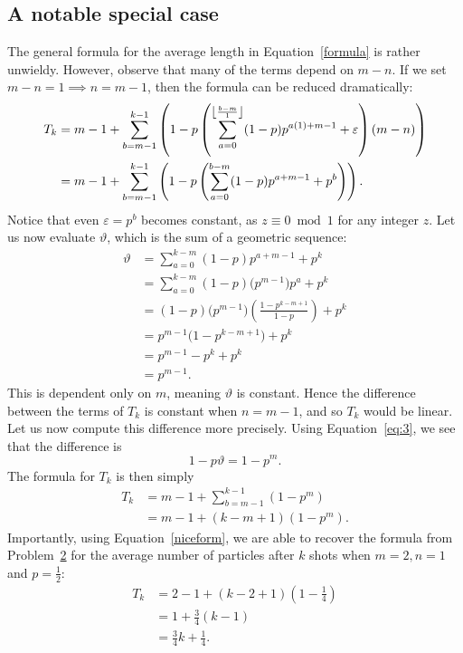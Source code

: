 \subsection{A notable special case}
The general formula for the average length in Equation~\ref{formula} is rather unwieldy. However, observe that many of the terms depend on $m-n$. If we set  $m-n = 1 \implies n = m - 1$, then the formula can be reduced dramatically:
\begin{align}
  T_k &= m-1+\sum _{b=m-1}^{k-1} \left(1-p \left(\sum _{a=0}^{\floor*{\frac{b-m}{1}} } (1-p) p^{a (1)+m-1}+\varepsilon\right) (m-n)\right) \nonumber \\
      &= m-1+\sum _{b=m-1}^{k-1} \left(1-p \left(\sum _{a=0}^{b-m} (1-p) p^{a+m-1}+ p^{b} \right) \right). \label{eq:3}
\end{align}
Notice that even $\varepsilon = p^{b}$ becomes constant, as $z \equiv 0 \bmod 1$ for any integer  $z$. Let us now evaluate $\vartheta$, which is the sum of a geometric sequence:
\begin{align*}
  \vartheta &= \sum_{a=0}^{k-m} (1-p)p^{a+m-1} + p^k \\
            &= \sum_{a=0}^{k-m} (1-p)\bigl(p^{m-1}\bigr)p^{a} + p^k \\
            &= (1-p)\bigl(p^{m-1}\bigr)\left(\frac{1-p^{k-m+1}}{1-p}\right) + p^k \\
            &= p^{m-1}\bigl(1-p^{k-m+1}\bigr) + p^k \\
            &= p^{m-1} - p^{k} + p^{k} \\
            &= p^{m-1}.
\end{align*}
This is dependent only on $m$, meaning $\vartheta$ is constant. Hence the difference between the terms of $T_k$ is constant when $n = m-1$, and so $T_k$ would be linear. Let us now compute this difference more precisely. Using Equation~\ref{eq:3}, we see that the difference is \[
  1-p\vartheta = 1-p^{m}
.\] The formula for $T_k$ is then simply 
\begin{align}
  T_k &= m-1 + \sum_{b=m-1}^{k-1} \left(1-p^m\right) \nonumber \\
      &= m-1 + (k-m+1)\left(1 - p^m\right). \label{niceform}
\end{align}
Importantly, using Equation~\ref{niceform}, we are able to recover the formula from Problem~\hyperlink{p2}{2} for the average number of particles after $k$ shots when $m = 2, n = 1$ and $p = \frac{1}{2}$: 
\begin{align*}
  T_k &= 2 - 1 + (k-2+1)\left(1 - \frac{1}{4}\right) \\
      &= 1 + \frac{3}{4}(k-1) \\
      &= \frac{3}{4}k + \frac{1}{4}.
\end{align*}
